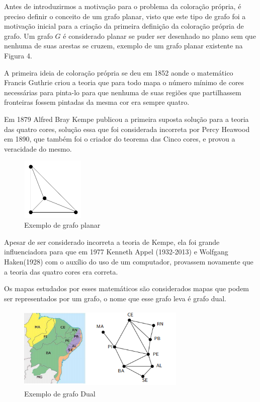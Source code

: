 \documentclass[12pt]{article}
\begin{document}
	Antes de introduzirmos a motivação para o problema da coloração própria, é preciso definir o conceito de um grafo planar, visto que este tipo de grafo foi a motivação inicial para a criação da primeira definição da coloração própria de grafo.
	Um grafo $G$ é considerado planar se puder ser desenhado no plano sem que nenhuma de suas arestas se cruzem, exemplo de um grafo planar existente na Figura 4.
		
	
	A primeira ideia de coloração própria se deu em 1852 aonde o matemático Francis Guthrie criou a teoria que para todo mapa o número mínimo de cores necessárias para pinta-lo para que nenhuma de suas regiões que partilhassem fronteiras fossem pintadas da mesma cor era sempre quatro.
	
	
	Em 1879 Alfred Bray Kempe publicou a primeira suposta solução para a teoria das quatro cores, solução essa que foi considerada incorreta por Percy Heawood em 1890, que também foi o criador do teorema das Cinco cores, e provou a veracidade do mesmo.
		
	\begin{figure}[!htb]
		\centering
		\includegraphics[width=3cm, height=3cm]{grafoPlanar}
		\caption{Exemplo de grafo planar}    
	\end{figure}

	Apesar de ser considerado incorreta a teoria de Kempe, ela foi grande influenciadora para que em 1977 Kenneth Appel (1932-2013) e Wolfgang Haken(1928) com o auxílio do uso de um computador, provassem novamente que a teoria das quatro cores era correta.
	
	Os mapas estudados por esses matemáticos são considerados mapas que podem ser representados por um grafo, o nome que esse grafo leva é grafo dual. 
	
	\begin{figure}[!htb]
		\centering
		 \includegraphics[width=8cm,height=4cm]{grafoDual}
		\caption{Exemplo de grafo Dual}    
	\end{figure}
\end{document}
